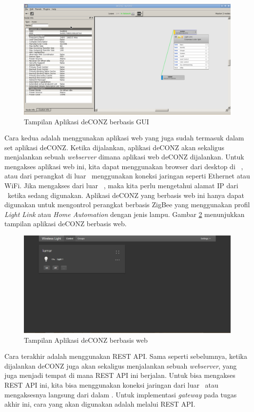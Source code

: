 \begin{figure}
	\centering
	\includegraphics[width=.9\textwidth]{pics/deCONZ-gui.png}
	\caption{Tampilan Aplikasi deCONZ berbasis GUI}
	\label{fig:deconz-gui}
\end{figure}

Cara kedua adalah menggunakan aplikasi web yang juga sudah termasuk dalam set aplikasi deCONZ. Ketika dijalankan, aplikasi deCONZ akan sekaligus menjalankan sebuah \textit{webserver} dimana aplikasi web deCONZ dijalankan. Untuk mengakses aplikasi web ini, kita dapat menggunakan browser dari desktop di \rasp~, atau dari perangkat di luar \rasp~menggunakan koneksi jaringan seperti Ethernet atau WiFi. Jika mengakses dari luar \rasp~, maka kita perlu mengetahui alamat IP dari \rasp~ketika sedang digunakan. Aplikasi deCONZ yang berbasis web ini hanya dapat digunakan untuk mengontrol perangkat berbasis ZigBee yang menggunakan profil \textit{Light Link} atau \textit{Home Automation} dengan jenis lampu. Gambar \ref{fig:deconz-web} menunjukkan tampilan aplikasi deCONZ berbasis web.

\begin{figure}
	\centering
	\includegraphics[width=.9\textwidth]{pics/deCONZ-web.png}
	\caption{Tampilan Aplikasi deCONZ berbasis web}
	\label{fig:deconz-web}
\end{figure}

Cara terakhir adalah menggunakan REST API. Sama seperti sebelumnya, ketika dijalankan deCONZ juga akan sekaligus menjalankan sebuah \textit{webserver}, yang juga menjadi tempat di mana REST API ini berjalan. Untuk bisa mengakses REST API ini, kita bisa menggunakan koneksi jaringan dari luar \rasp~atau mengaksesnya langsung dari dalam \rasp. Untuk implementasi \textit{gateway} pada tugas akhir ini, cara yang akan digunakan adalah melalui REST API.

